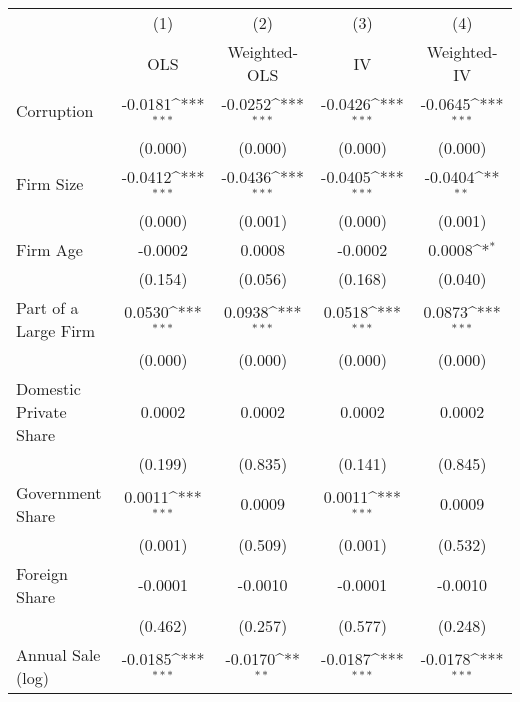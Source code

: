 {
\def\sym#1{\ifmmode^{#1}\else\(^{#1}\)\fi}
\begin{tabular}{l*{4}{c}}
\hline\hline
                    &\multicolumn{1}{c}{(1)}         &\multicolumn{1}{c}{(2)}         &\multicolumn{1}{c}{(3)}         &\multicolumn{1}{c}{(4)}         \\
                    &         OLS         &Weighted-OLS         &          IV         & Weighted-IV         \\
\hline
Corruption          &     -0.0181\sym{***}&     -0.0252\sym{***}&     -0.0426\sym{***}&     -0.0645\sym{***}\\
                    &     (0.000)         &     (0.000)         &     (0.000)         &     (0.000)         \\
Firm Size           &     -0.0412\sym{***}&     -0.0436\sym{***}&     -0.0405\sym{***}&     -0.0404\sym{**} \\
                    &     (0.000)         &     (0.001)         &     (0.000)         &     (0.001)         \\
Firm Age            &     -0.0002         &      0.0008         &     -0.0002         &      0.0008\sym{*}  \\
                    &     (0.154)         &     (0.056)         &     (0.168)         &     (0.040)         \\
Part of a Large Firm&      0.0530\sym{***}&      0.0938\sym{***}&      0.0518\sym{***}&      0.0873\sym{***}\\
                    &     (0.000)         &     (0.000)         &     (0.000)         &     (0.000)         \\
Domestic Private Share&      0.0002         &      0.0002         &      0.0002         &      0.0002         \\
                    &     (0.199)         &     (0.835)         &     (0.141)         &     (0.845)         \\
Government Share    &      0.0011\sym{***}&      0.0009         &      0.0011\sym{***}&      0.0009         \\
                    &     (0.001)         &     (0.509)         &     (0.001)         &     (0.532)         \\
Foreign Share       &     -0.0001         &     -0.0010         &     -0.0001         &     -0.0010         \\
                    &     (0.462)         &     (0.257)         &     (0.577)         &     (0.248)         \\
Annual Sale (log)   &     -0.0185\sym{***}&     -0.0170\sym{**} &     -0.0187\sym{***}&     -0.0178\sym{***}\\

\end{tabular}}
